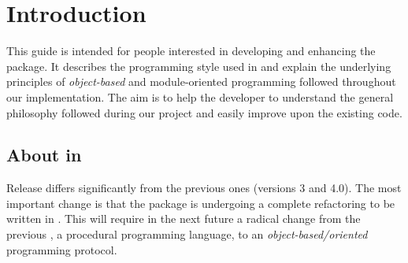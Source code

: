 \chapter{Introduction}


This guide is intended for people interested in developing and enhancing
the \PR package. It describes the \fort programming style used in \PR and
explain the underlying principles of {\em object-based} and module-oriented
programming followed throughout our implementation.  The aim is to help the
developer to understand the general philosophy followed during our project
and easily improve upon the existing code.

\section{About \fort in \PR}

Release \PR differs significantly from the previous ones (versions 3 and
4.0).  The most important change is that the package is undergoing a complete
refactoring to be written in \fort. This will require in the next future a
radical change from the previous \oldfort, a procedural programming language,
to an {\em object-based/oriented} programming protocol.

